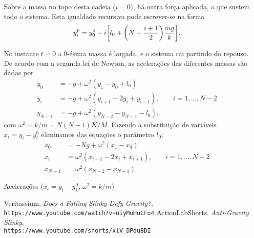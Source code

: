 \documentclass{article}
\begin{document}
\vspace{0.75em}
\noindent
Sobre a massa no topo desta cadeia ($i=0$), há outra força aplicada, a que
sustem todo o sistema. Esta igualdade recursiva pode escrever-se na forma
\begin{equation}
  y^0_i = y^0_0 - i\qty[l_0 + \qty(N-\frac{i+1}{2})\frac{mg}{k}].
\end{equation}

No instante $t=0$ a 0-ésima massa é largada, e o sistema cai partindo do
repouso. De acordo com a segunda lei de Newton, as acelerações das diferentes
massas são dadas por
\begin{equation}
  \begin{aligned}
    \ddot y_0     &= -g + \omega^2 (y_1-y_0+l_0)\\
    \ddot y_i     &= -g + \omega^2 
      (y_{i+1}-2y_i+y_{i-1}),\qquad i=1, \ldots, N-2\\
    \ddot y_{N-1} &= -g + \omega^2 (y_{N-2}-y_{N-1}-l_0),
  \end{aligned}
\end{equation}
com $\omega^2=k/m=N(N-1)K/M$. Fazendo a substituição de variáveis $x_i=y_i -
y_i^0$ eliminamos das equações o parâmetro $l_0$:
\begin{equation}
  \begin{aligned}
    \ddot x_0 &=-Ng+\omega^2(x_1-x_0)\\
    \ddot x_i &= \omega^2(x_{i-1}-2x_i+x_{i+1}),\qquad i=1, \ldots, N-2\\
    \ddot x_{N-1} &=\omega^2(x_{N-2}-x_{N-1})
  \end{aligned}
\end{equation}


\textsf{Acelerações ($x_i=y_i-y_i^0$, $\omega^2=k/m$)}

\begin{thebibliography}{100}
   Veritassium, 
    \textsl{Does a Falling Slinky Defy Gravity?,}\\
    \texttt{https://www.youtube.com/watch?v=uiyMuHuCFo4}
      ActionLabShorts,
      \textsl{Anti-Gravity Slinky,}\\
      \texttt{https://www.youtube.com/shorts/xlV\_DPdu8DI}
\end{thebibliography}
\end{document}
